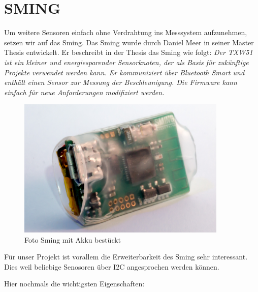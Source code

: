 \chapter{SMING}\label{sec:sming}
Um weitere Sensoren einfach ohne Verdrahtung ins Messsystem aufzunehmen, setzen wir auf das Sming. Das Sming wurde durch Daniel Meer in seiner Master Thesis entwickelt. Er beschreibt in der Thesis das Sming wie folgt: \textit{Der TXW51 ist ein kleiner und energiesparender Sensorknoten, der als Basis für zukünftige Projekte verwendet werden kann. Er kommuniziert über Bluetooth Smart und enthält einen Sensor zur Messung der Beschleunigung. Die Firmware kann einfach für neue Anforderungen modifiziert werden.}\cite{meer:masterthesis}

\begin{figure}[hbtp]
	\center
	\includegraphics[width=10cm]{bilder/foto-6.jpg}
	\caption{Foto Sming mit Akku bestückt}
	\label{fig:sming}
\end{figure}

Für unser Projekt ist vorallem die Erweiterbarkeit des Sming sehr interessant. Dies weil beliebige Senosoren über I2C angesprochen werden können.

Hier nochmals die wichtigsten Eigenschaften:

